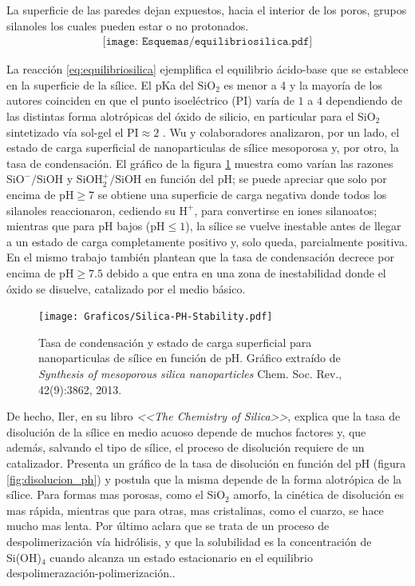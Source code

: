 	La superficie de las paredes dejan expuestos, hacia el interior de los poros, grupos silanoles los cuales pueden estar o no protonados.\cite{Brinker1990,Soler-Illia2011} 
			\begin{equation}
				\begin{aligned}
				\texttt{[image: Esquemas/equilibriosilica.pdf]}
				\label{eq:equilibriosilica}
				\end{aligned}
				\end{equation}

	La reacción \ref{eq:equilibriosilica} ejemplifica el equilibrio ácido-base que se establece en la superficie de la sílice. El pKa del $\text{SiO}_2$ es menor a 4 y la mayoría de los autores coinciden en que el punto isoeléctrico (PI) varía de $1$ a $4$ dependiendo de  las distintas forma alotrópicas del óxido de silicio, en particular para el SiO$_2$ sintetizado vía sol-gel el $\text{PI}\approx 2$ \cite{Kosmulski2002,Kosmulski2014,Schwarz1984,Si-HanWu2013}.
	Wu y colaboradores\cite{Si-HanWu2013} analizaron, por un lado, el estado de carga superficial de nanoparticulas de sílice mesoporosa y, por otro, la tasa de condensación. El gráfico de la figura \ref{fig:silica_ph} muestra como varían las razones  $\text{SiO}^{-}/\text{SiOH}$ y $\text{SiOH}_2^{+}/\text{SiOH}$ en función del pH; se puede apreciar que solo por encima de $\text{pH}\geq7$ se obtiene una superficie de carga negativa donde todos los silanoles reaccionaron, cediendo su $\text{H}^{+}$, para convertirse en iones silanoatos; mientras que para pH bajos ($\text{pH}\leq1$), la sílice se vuelve inestable antes de llegar a un estado de carga completamente positivo y, solo queda, parcialmente positiva. En el mismo trabajo\cite{Si-HanWu2013} también plantean que la tasa de condensación decrece por encima de $\text{pH}\geq7.5$ debido a que entra en una zona de inestabilidad donde el óxido se disuelve, catalizado por el medio básico.
		\begin{figure}[th!]
			\centering
 	       	\texttt{[image: Graficos/Silica-PH-Stability.pdf]}
	    	\caption[Tasa de condensación y estado de carga superficial]{Tasa de condensación y estado de carga superficial para nanoparticulas de sílice en función de pH. Gráfico extraído de \textit{Synthesis of mesoporous silica nanoparticles} Chem. Soc. Rev., 42(9):3862, 2013.\cite{Si-HanWu2013}}
	       	\label{fig:silica_ph}
	    	\end{figure}
	De hecho, Iler, en su libro \textit{<<The Chemistry of Silica>>}, explica que la tasa de disolución de la sílice en medio acuoso depende de muchos factores y, que además, salvando el tipo de sílice, el proceso de disolución requiere de un catalizador. Presenta un gráfico de la tasa de disolución en función del pH (figura \ref{fig:disolucion_ph}) y postula que la misma depende de la forma alotrópica de la sílice. Para formas mas porosas, como el SiO$_2$ amorfo, la cinética de disolución es mas rápida, mientras que para otras, mas cristalinas, como el cuarzo, se hace mucho mas lenta. Por último aclara que se trata de un proceso de despolimerización vía hidrólisis, y que la solubilidad es la concentración de Si(OH)$_4$ cuando alcanza un estado estacionario en el equilibrio despolimerazación-polimerización.\cite{iler1979}. 

